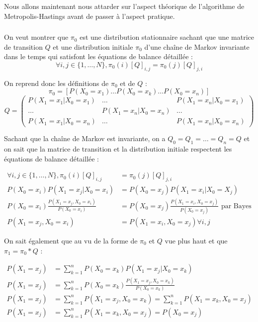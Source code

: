 Nous allons maintenant nous attarder sur l'aspect théorique de l'algorithme de 
Metropolis-Hastings avant de passer à l'aspect pratique.

\subsubsection{}
On veut montrer que $\pi_0$ est une distribution stationnaire sachant que une matrice de transition $Q$ et une distribution initiale $\pi_0$ 
d'une chaîne de Markov invariante dans le temps qui satisfont les équations de balance détaillée :
\begin{equation*}
  \forall i,j \in \{ 1,\dots,N \}, \pi_0(i)[Q]_{i,j} = \pi_0(j)[Q]_{j,i}
\end{equation*}

On reprend donc les définitions de $\pi_0$ et de $Q$ :
\begin{equation*}
  \pi_0 = [P(X_0=x_1) \dots P(X_0=x_k) \dots P(X_0=x_n)]
\end{equation*}
$$Q = \begin{pmatrix}
  P(X_1 = x_1|X_0=x_1) & \dots & P(X_1 = x_n|X_0=x_1)\\
  \dots & P(X_1 = x_n|X_0=x_n) & \dots\\
  P(X_1 = x_1|X_0=x_n) & \dots & P(X_1 = x_n|X_0=x_n)
\end{pmatrix}$$

Sachant que la chaîne de Markov est invariante, on a $Q_0 = Q_1 = \dots = Q_n = Q$ et on sait que la matrice de transition et la distribution initiale respectent les équations de balance détaillée :

\begin{align*}
  \forall i,j \in \{ 1,\dots,N \}, \pi_0(i)[Q]_{i,j} &= \pi_0(j)[Q]_{j,i}\\
  P(X_0=x_i)P(X_1=x_j|X_0=x_i) &= P(X_0 = x_j)P(X_1=x_i|X_0=X_j)\\
  P(X_0=x_i)\frac{P(X_1=x_j,X_0=x_i)}{P(X_0=x_i)} &= P(X_0=x_j)\frac{P(X_1=x_i,X_0=x_j)}{P(X_0=x_j)} \text{ par Bayes}\\
  P(X_1=x_j,X_0=x_i) &= P(X_1=x_i,X_0=x_j) \forall i,j
\end{align*}

On sait également que au vu de la forme de $\pi_0$ et $Q$ vue plus haut et que $\pi_1 = \pi_0 * Q$ :

\begin{align*}
  P(X_1=x_j) &= \sum_{k=1}^n P(X_0=x_k)P(X_1=x_j|X_0=x_k)\\
  P(X_1=x_j) &= \sum_{k=1}^n P(X_0=x_k)\frac{P(X_1=x_j,X_0=x_k)}{P(X_0=x_k)}\\
  P(X_1=x_j) &= \sum_{k=1}^n P(X_1=x_j,X_0=x_k) = \sum_{k=1}^n P(X_1=x_k,X_0=x_j)\\
  P(X_1=x_j) &= \sum_{k=1}^n P(X_1=x_k,X_0=x_j) = P(X_0=x_j)
\end{align*}

